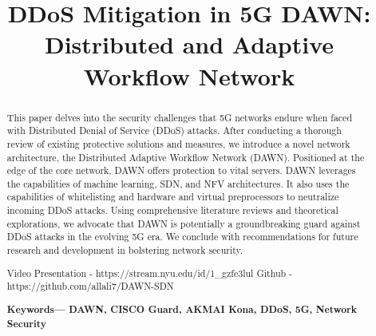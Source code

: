 \documentclass[conference]{IEEEtran}
\begin{document}
\title{DDoS Mitigation in 5G
DAWN: Distributed and Adaptive Workflow Network
}
\author{
}
\maketitle 
\begin{abstract} 
This paper delves into the security challenges that 5G networks endure when faced with Distributed Denial of Service (DDoS) attacks. After conducting a thorough review of existing protective solutions and measures, we introduce a novel network architecture, the Distributed Adaptive Workflow Network (DAWN). Positioned at the edge of the core network, DAWN offers  protection to vital servers. DAWN leverages the capabilities of machine learning, SDN, and NFV architectures. It also uses the capabilities of whitelisting and hardware and virtual preprocessors to neutralize incoming DDoS attacks. Using comprehensive literature reviews and theoretical explorations, we advocate that DAWN is potentially a groundbreaking guard against DDoS attacks in the evolving 5G era.  We conclude with recommendations for future research and development in bolstering network security. 

Video Presentation - https://stream.nyu.edu/id/1\_gzfe3lul
Github - https://github.com/allali7/DAWN-SDN

\textbf{Keywords— DAWN, CISCO Guard, AKMAI Kona, DDoS, 5G, Network Security}
\end{abstract}
\end{document}
